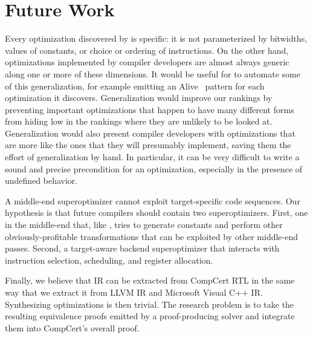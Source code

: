 \section{Future Work}

Every optimization discovered by \tool{} is specific: it is not
parameterized by bitwidths, values of constants, or choice or ordering
of instructions.
%
On the other hand, optimizations implemented by compiler developers are
almost always generic along one or more of these dimensions.
%
It would be useful for \tool{} to automate some of this
generalization, for example emitting an Alive~\cite{Lopes15} pattern
for each optimization it discovers.
%
Generalization would improve our rankings by preventing important
optimizations that happen to have many different forms from hiding low
in the rankings where they are unlikely to be looked at.
%
Generalization would also present compiler developers with
optimizations that are more like the ones that they will presumably
implement, saving them the effort of generalization by hand.
%
In particular, it can be very difficult to write a sound and precise
precondition for an optimization, especially in the presence
of undefined behavior.


A middle-end superoptimizer cannot exploit
target-specific code sequences.
%
Our hypothesis is that future compilers should contain two
superoptimizers.
%
First, one in the middle-end that, like \tool{}, tries to generate
constants and perform other obviously-profitable transformations that
can be exploited by other middle-end passes.
%
Second, a target-aware backend superoptimizer that interacts with
instruction selection, scheduling, and register allocation.


Finally, we believe that \tool{} IR can be extracted from CompCert RTL
in the same way that we extract it from LLVM IR and Microsoft Visual
C++ IR\@.
%
Synthesizing optimizations is then trivial.
%
The research problem is to take the resulting equivalence proofs
emitted by a proof-producing solver and integrate them into CompCert's
overall proof.

